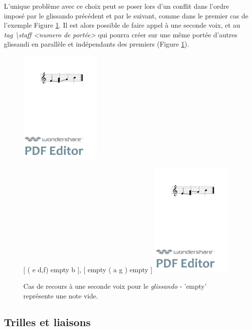 \documentclass{article}
\newenvironment{gmncode}	{\vspace{-2mm}\small\verbatim}{\endverbatim\vspace{-2mm}}
\begin{document}
L'unique problème avec ce choix peut se poser lors d'un conflit dans l'ordre imposé par le glissando précédent et par le suivant, comme dans le premier cas de l'exemple Figure \ref{fig:glissandopb}. Il est alors possible de faire appel à une seconde voix, et au \emph{tag \textbackslash{}staff \textless{}numero de portée\textgreater{}} qui pourra créer sur une même portée d'autres glissandi en parallèle et indépendants des premiers (Figure \ref{fig:glissandopb}).


\begin{figure}[h]
\centering
\begin{gmncode}
[ \glissando(e {d,f,a} g) b ]
\end{gmncode}
\includegraphics[width=4cm]{img/glissandopb.pdf}

\begin{gmncode}
{ 
  [ \glissando( e {d,f}) empty b ],
  [  empty \glissando( a g ) empty ] 
}
\end{gmncode}
\includegraphics[width=4cm]{img/glissandosanspb.pdf}
\caption{Cas de recours à une seconde voix pour le \emph{glissando} -
'empty' représente une note vide.}
\label{fig:glissandopb}
\end{figure}


\subsection{Trilles et liaisons}\label{subsec:trillesLiaison}
\end{document}
